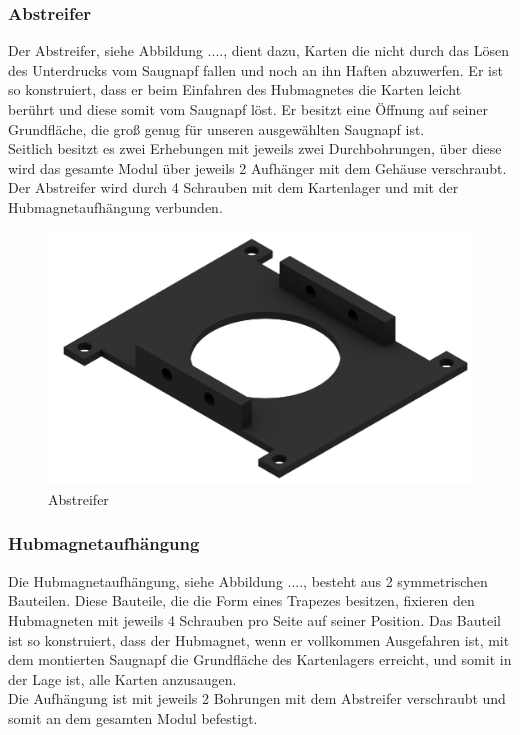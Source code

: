 \subsubsection{Abstreifer}

Der Abstreifer, siehe Abbildung ...., dient dazu, Karten die nicht durch das Lösen des Unterdrucks vom Saugnapf fallen und noch an ihn Haften
abzuwerfen. Er ist so konstruiert, dass er beim Einfahren des Hubmagnetes die Karten leicht berührt und diese somit vom
Saugnapf löst. Er besitzt eine Öffnung auf seiner Grundfläche, die groß genug für unseren ausgewählten Saugnapf ist.\\
Seitlich besitzt es zwei Erhebungen mit jeweils zwei Durchbohrungen, über diese wird das gesamte Modul über jeweils 2 Aufhänger
mit dem Gehäuse verschraubt. \\
Der Abstreifer wird durch 4 Schrauben mit dem Kartenlager und mit der Hubmagnetaufhängung  verbunden.

\begin{figure}
    \centering
    \includegraphics[scale=0.5,page=1]{fig/mech/Abstreifer.png}
    \caption{Abstreifer}
\end{figure}

\subsubsection{Hubmagnetaufhängung}

Die Hubmagnetaufhängung, siehe Abbildung ...., besteht aus 2 symmetrischen Bauteilen. Diese Bauteile, die die Form eines Trapezes besitzen, fixieren den
Hubmagneten mit jeweils 4 Schrauben pro Seite auf seiner Position. Das Bauteil ist so konstruiert, dass der Hubmagnet, wenn er
vollkommen Ausgefahren ist, mit dem montierten Saugnapf die Grundfläche des Kartenlagers erreicht, und somit in der Lage ist,
alle Karten anzusaugen.\\
Die Aufhängung ist mit jeweils 2 Bohrungen mit dem Abstreifer verschraubt und somit an dem gesamten Modul befestigt.


